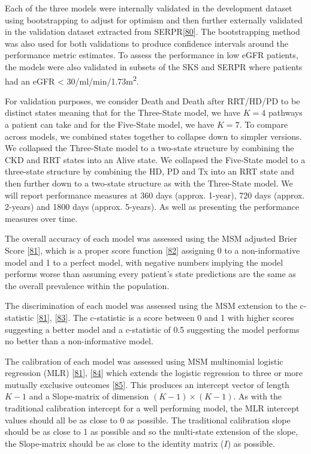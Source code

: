 \documentclass[
]{article}
\begin{document}
Each of the three models were internally validated in the development dataset using bootstrapping to adjust for optimism and then further externally validated in the validation dataset extracted from SERPR{[}\protect\hyperlink{ref-schomaker_bootstrap_2018}{80}{]}. The bootstrapping method was also used for both validations to produce confidence intervals around the performance metric estimates. To assess the performance in low eGFR patients, the models were also validated in subsets of the SKS and SERPR where patients had an eGFR \textless{} 30/ml/min/1.73m\textsuperscript{2}.

For validation purposes, we consider Death and Death after RRT/HD/PD to be distinct states meaning that for the Three-State model, we have \(K=4\) pathways a patient can take and for the Five-State model, we have \(K=7\). To compare across models, we combined states together to collapse down to simpler versions. We collapsed the Three-State model to a two-state structure by combining the CKD and RRT states into an Alive state. We collapsed the Five-State model to a three-state structure by combining the HD, PD and Tx into an RRT state and then further down to a two-state structure as with the Three-State model. We will report performance measures at 360 days (approx. 1-year), 720 days (approx. 2-years) and 1800 days (approx. 5-years). As well as presenting the performance measures over time.

The overall accuracy of each model was assessed using the MSM adjusted Brier Score {[}\protect\hyperlink{ref-chap-performance-metrics}{81}{]}, which is a proper score function {[}\protect\hyperlink{ref-gneiting_strictly_2007}{82}{]} assigning 0 to a non-informative model and 1 to a perfect model, with negative numbers implying the model performs worse than assuming every patient's state predictions are the same as the overall prevalence within the population.

The discrimination of each model was assessed using the MSM extension to the c-statistic {[}\protect\hyperlink{ref-chap-performance-metrics}{81}{]}, {[}\protect\hyperlink{ref-calster_extending_2012-1}{83}{]}. The c-statistic is a score between 0 and 1 with higher scores suggesting a better model and a c-statistic of 0.5 suggesting the model performs no better than a non-informative model.

The calibration of each model was assessed using MSM multinomial logistic regression (MLR) {[}\protect\hyperlink{ref-chap-performance-metrics}{81}{]}, {[}\protect\hyperlink{ref-hoorde_assessing_2014}{84}{]} which extends the logistic regression to three or more mutually exclusive outcomes {[}\protect\hyperlink{ref-riley_prognosis_2019}{85}{]}. This produces an intercept vector of length \(K-1\) and a Slope-matrix of dimension \((K-1) \times (K-1)\). As with the traditional calibration intercept for a well performing model, the MLR intercept values should all be as close to 0 as possible. The traditional calibration slope should be as close to 1 as possible and so the multi-state extension of the slope, the Slope-matrix should be as close to the identity matrix (\(I\)) as possible.
\end{document}
